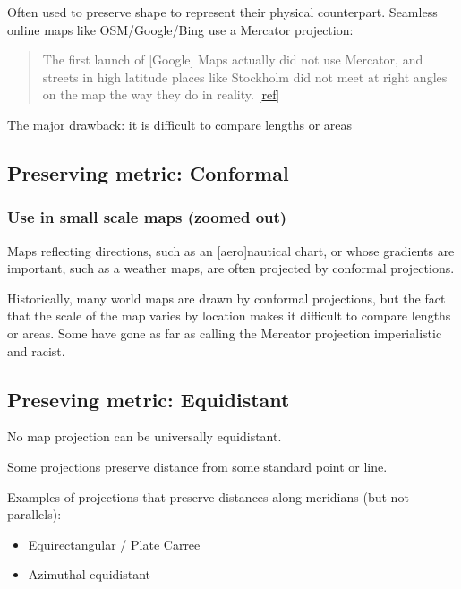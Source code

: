 \documentclass[11pt]{article}
\providecommand{\tightlist}{%
      \setlength{\itemsep}{0pt}\setlength{\parskip}{0pt}}
\begin{document}
Often used to preserve shape to represent their physical counterpart.
Seamless online maps like OSM/Google/Bing use a Mercator projection:

\begin{quote}
The first launch of {[}Google{]} Maps actually did not use Mercator, and
streets in high latitude places like Stockholm did not meet at right
angles on the map the way they do in reality.
{[}\href{https://productforums.google.com/d/msg/maps/A2ygEJ5eG-o/KbZr_B0h2hkJ}{ref}{]}
\end{quote}

The major drawback: it is difficult to compare lengths or areas

    \hypertarget{preserving-metric-conformal}{%
\subsection{Preserving metric:
Conformal}\label{preserving-metric-conformal}}

\hypertarget{use-in-small-scale-maps-zoomed-out}{%
\subsubsection{Use in small scale maps (zoomed
out)}\label{use-in-small-scale-maps-zoomed-out}}

Maps reflecting directions, such as an {[}aero{]}nautical chart, or
whose gradients are important, such as a weather maps, are often
projected by conformal projections.

Historically, many world maps are drawn by conformal projections, but
the fact that the scale of the map varies by location makes it difficult
to compare lengths or areas. Some have gone as far as calling the
Mercator projection imperialistic and racist.

    \hypertarget{preseving-metric-equidistant}{%
\subsection{Preseving metric:
Equidistant}\label{preseving-metric-equidistant}}

No map projection can be universally equidistant.

Some projections preserve distance from some standard point or line.

Examples of projections that preserve distances along meridians (but not
parallels):

\begin{itemize}
\tightlist
\item
  Equirectangular / Plate Carree
\item
  Azimuthal equidistant
\end{itemize}
\end{document}
